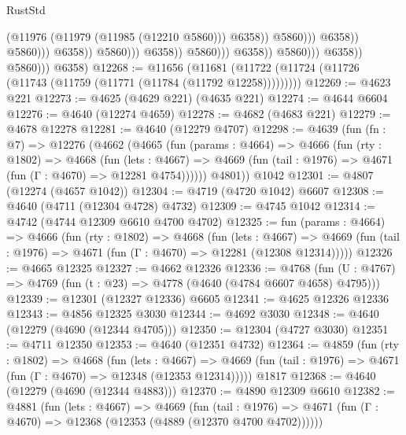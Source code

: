 \begin{lexlean}{RustStd}
\begin{coremodule}
                                                                (@11976
                                                                  (@11979 (@11985 (@12210 @5860)))
                                                                  @6358))
                                                              @5860)))
                                                        @6358))
                                                    @5860)))
                                              @6358))
                                          @5860)))
                                    @6358))
                                @5860)))
                          @6358))
                      @5860)))
                @6358))
            @5860)))
      @6358)
@12268 := @11656
    (@11681 (@11722 (@11724 (@11726 (@11743 (@11759 (@11771 (@11784 (@11792 @12258)))))))))
@12269 := @4623 @221
@12273 := @4625 (@4629 @221) (@4635 @221)
@12274 := @4644 @6604
@12276 := @4640 (@12274 @4659)
@12278 := @4682 (@4683 @221)
@12279 := @4678 @12278
@12281 := @4640 (@12279 @4707)
@12298 := @4639
    (fun (fn : @7) =>
    @12276
      (@4662
        (@4665
          (fun (params : @4664) =>
          @4666
            (fun (rty : @1802) =>
            @4668
              (fun (lets : @4667) =>
              @4669 (fun (tail : @1976) => @4671 (fun (Γ : @4670) => @12281 @4754))))))
        @4801))
    @1042
@12301 := @4807 (@12274 (@4657 @1042))
@12304 := @4719 (@4720 @1042) @6607
@12308 := @4640 (@4711 (@12304 @4728) @4732)
@12309 := @4745 @1042
@12314 := @4742 (@4744 @12309 @6610 @4700 @4702)
@12325 := fun (params : @4664) =>
  @4666
    (fun (rty : @1802) =>
    @4668
      (fun (lets : @4667) =>
      @4669 (fun (tail : @1976) => @4671 (fun (Γ : @4670) => @12281 (@12308 @12314)))))
@12326 := @4665 @12325
@12327 := @4662 @12326
@12336 := @4768
    (fun (U : @4767) => @4769 (fun (t : @23) => @4778 (@4640 (@4784 @6607 @4658) @4795)))
@12339 := @12301 (@12327 @12336) @6605
@12341 := @4625 @12326 @12336
@12343 := @4856 @12325 @3030
@12344 := @4692 @3030
@12348 := @4640 (@12279 (@4690 (@12344 @4705)))
@12350 := @12304 (@4727 @3030)
@12351 := @4711 @12350
@12353 := @4640 (@12351 @4732)
@12364 := @4859
    (fun (rty : @1802) =>
    @4668
      (fun (lets : @4667) =>
      @4669 (fun (tail : @1976) => @4671 (fun (Γ : @4670) => @12348 (@12353 @12314)))))
    @1817
@12368 := @4640 (@12279 (@4690 (@12344 @4883)))
@12370 := @4890 @12309 @6610
@12382 := @4881
    (fun (lets : @4667) =>
    @4669
      (fun (tail : @1976) =>
      @4671 (fun (Γ : @4670) => @12368 (@12353 (@4889 (@12370 @4700 @4702))))))

\end{coremodule}
\end{lexlean}
